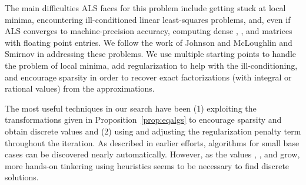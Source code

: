 \documentclass[preprint]{sigplanconf}
\begin{document}
The main difficulties ALS faces for this problem include getting stuck at local minima, encountering ill-conditioned linear least-squares problems, and, even if ALS converges to machine-precision accuracy, computing dense , , and  matrices with floating point entries.
We follow the work of Johnson and McLoughlin \cite{JM86} and Smirnov \cite{smirnov2013bilinear} in addressing these problems.
We use multiple starting points to handle the problem of local minima, add regularization to help with the ill-conditioning, and encourage sparsity in order to recover exact factorizations (with integral or rational values) from the approximations.

The most useful techniques in our search have been (1) exploiting the transformations given in Proposition~\ref{prop:eqalgs} to encourage sparsity and obtain discrete values and (2) using and adjusting the regularization penalty term \cite[Equations (4-5)]{smirnov2013bilinear} throughout the iteration. 
As described in earlier efforts, algorithms for small base cases can be discovered nearly automatically.
However, as the values , , and  grow, more hands-on tinkering using heuristics seems to be necessary to find discrete solutions.
\end{document}
